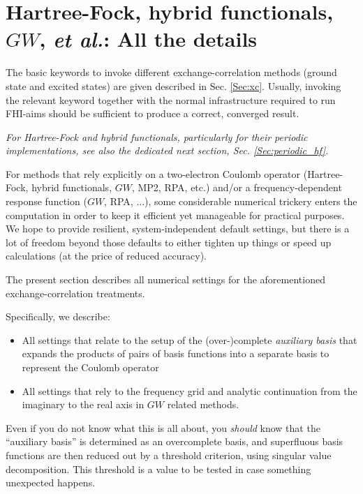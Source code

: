 \section{Hartree-Fock, hybrid functionals, $GW$, \emph{et al.}: All the details}
\label{Sec:auxil}

The basic keywords to invoke different exchange-correlation methods
(ground state and excited states) are given described in
Sec. \ref{Sec:xc}. Usually, invoking the relevant keyword together with
the normal infrastructure required to run FHI-aims should be
sufficient to produce a correct, converged result. 

\emph{For Hartree-Fock and hybrid functionals, particularly for their
  periodic implementations, see also the dedicated next section,
  Sec. \ref{Sec:periodic_hf}.}  

For methods that rely explicitly on a two-electron Coulomb operator
(Hartree-Fock, hybrid functionals, $GW$, MP2, RPA, etc.) and/or a
frequency-dependent response function ($GW$, RPA, ...), some
considerable numerical trickery enters the computation in order to
keep it efficient yet manageable for practical purposes. We
hope to provide resilient, system-independent default settings, 
but there is a lot of freedom beyond those defaults to either
tighten up things or speed up calculations (at the price of
reduced accuracy).

The present section describes all numerical settings for the
aforementioned exchange-correlation treatments. 

Specifically, we describe:
\begin{itemize}
  \item All settings that relate to the setup of the (over-)complete
    \emph{auxiliary basis} that expands the products of pairs of basis
    functions into a separate basis to represent the Coulomb operator
  \item All settings that rely to the frequency grid and analytic
    continuation from the imaginary to the real axis in $GW$ related
    methods. 
\end{itemize}
Even if you do not know what this is all about, you \emph{should} know
that the ``auxiliary basis'' is determined as an overcomplete basis,
and superfluous basis functions are then reduced out by a threshold
criterion, using singular value decomposition. This threshold is a 
value to be tested in case something unexpected happens.

